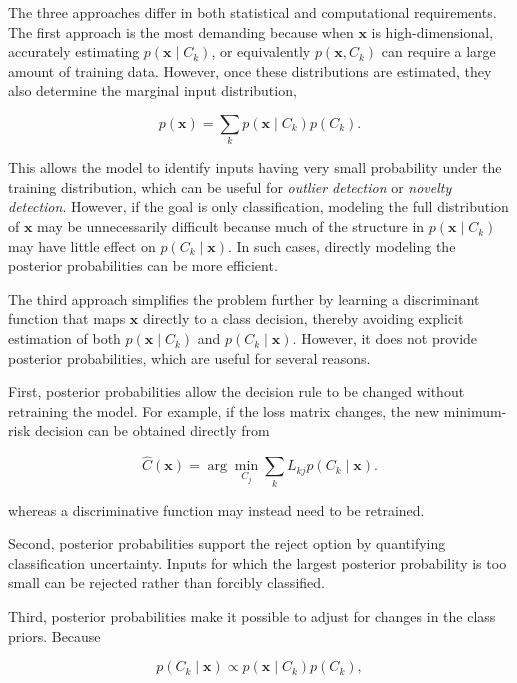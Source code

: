 \documentclass[10pt,twocolumn]{memoir}
\begin{document}
The three approaches differ in both statistical and computational requirements. The first approach is the most demanding because when $\mathbf{x}$ is high-dimensional, accurately estimating $p(\mathbf{x}\mid C_k)$, or equivalently $p(\mathbf{x},C_k)$ can require a large amount of training data. However, once these distributions are estimated, they also determine the marginal input distribution,

\begin{equation}
    p(\mathbf{x}) = \sum_k p(\mathbf{x}\mid C_k)p(C_k).
\end{equation}

This allows the model to identify inputs having very small probability under the training distribution, which can be useful for \textit{outlier detection} or \textit{novelty detection}. However, if the goal is only classification, modeling the full distribution of $\mathbf{x}$ may be unnecessarily difficult because much of the structure in $p(\mathbf{x}\mid C_k)$ may have little effect on $p(C_k\mid\mathbf{x})$. In such cases, directly modeling the posterior probabilities can be more efficient.

The third approach simplifies the problem further by learning a discriminant function that maps $\mathbf{x}$ directly to a class decision, thereby avoiding explicit estimation of both $p(\mathbf{x}\mid C_k)$ and $p(C_k\mid\mathbf{x})$. However, it does not provide posterior probabilities, which are useful for several reasons.

First, posterior probabilities allow the decision rule to be changed without retraining the model. For example, if the loss matrix changes, the new minimum-risk decision can be obtained directly from

\begin{equation}
    \hat{C}(\mathbf{x}) = \arg\min_{C_j}\sum_k L_{kj}p(C_k\mid\mathbf{x}).
\end{equation}

whereas a discriminative function may instead need to be retrained.

Second, posterior probabilities support the reject option by quantifying classification uncertainty. Inputs for which the largest posterior probability is too small can be rejected rather than forcibly classified.

Third, posterior probabilities make it possible to adjust for changes in the class priors. Because

\begin{equation}
    p(C_k\mid\mathbf{x}) \propto p(\mathbf{x}\mid C_k)p(C_k),
\end{equation}
\end{document}
